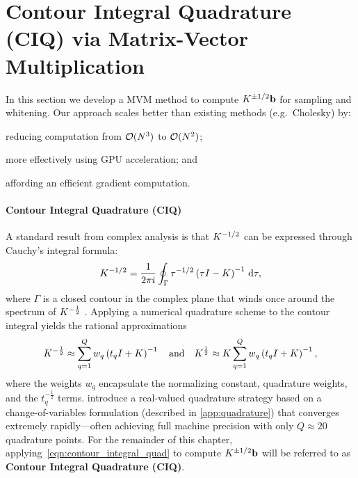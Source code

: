 \section{Contour Integral Quadrature (CIQ) via Matrix-Vector Multiplication}
\label{sec:ciq_method}

In this section we develop a MVM method to compute $K^{\pm 1/2} \mathbf{b}$ for sampling and whitening.
Our approach scales better than existing methods (e.g.~Cholesky) by:
\begin{enumerate*}
  \item reducing computation from $\bigo{N^3}$ to $\bigo{N^2}$;
  \item more effectively using GPU acceleration; and
  \item affording an efficient gradient computation.
\end{enumerate*}

\paragraph{Contour Integral Quadrature (CIQ)}
A standard result from complex analysis is that $K^{-1/2}$ can be expressed through Cauchy's integral formula:
%
$$
	K^{-1 / 2} = \frac{1}{2 \pi i} \oint_\Gamma \tau^{- 1 / 2} \left( \tau I - K \right)^{-1} \,\mathrm{d}{\tau},
$$
%
where $\Gamma$ is a closed contour in the complex plane that winds once around the spectrum of $K^{-\frac 1 2}$ \citep{davies2005computing,hale2008computing,higham2008functions}.
Applying a numerical quadrature scheme to the contour integral yields the rational approximations
%
\begin{equation}
	K^{-\frac 1 2} \approx \sum_{q=1}^Q w_q \left( t_q I + K \right)^{-1}
  \quad \text{and} \quad
	K^{\frac 1 2} \approx K \sum_{q=1}^Q w_q \left( t_q I + K \right)^{-1},
	\label{eqn:contour_integral_quad}
\end{equation}
%
where the weights $w_q$ encapsulate the normalizing constant, quadrature weights, and the $t_q^{-\frac 1 2}$ terms.
\citet{hale2008computing} introduce a real-valued quadrature strategy based on a change-of-variables formulation (described in \cref{app:quadrature})
that converges extremely rapidly---often achieving full machine precision with only $Q \approx 20$ quadrature points.
For the remainder of this chapter, applying~\cref{eqn:contour_integral_quad} to compute $K^{\pm1/2} \mathbf{b}$  will be referred to as {\bf Contour Integral Quadrature (CIQ)}.



